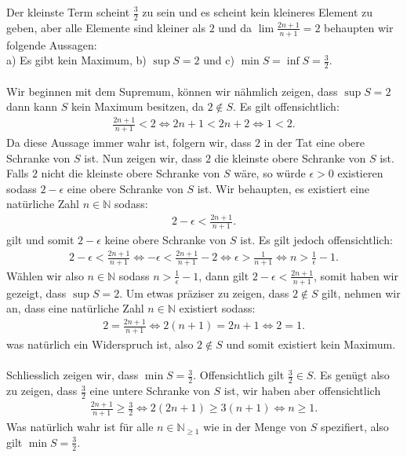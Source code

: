 \documentclass[a4paper, 20]{exam}
\begin{document}
\begin{solution} Der kleinste Term scheint $\frac{3}{2}$ zu sein und es scheint kein kleineres Element zu geben, aber alle Elemente sind kleiner als $2$ und da $\lim \frac{2n+1}{n+1}=2$ behaupten wir folgende Aussagen: \\
a) Es gibt kein Maximum, b) $\sup S =2$ und c) $\min S= \inf S = \frac{3}{2}$. 
\\\\
Wir beginnen mit dem Supremum, können wir nähmlich zeigen, dass $\sup S=2$ dann kann $S$ kein Maximum besitzen, da $2 \notin S$. Es gilt offensichtlich:
\begin{align*}
\frac{2n+1}{n+1} < 2 \iff 2n+1 < 2n+2 \iff 1 <2.
\end{align*}
Da diese Aussage immer wahr ist, folgern wir, dass $2$ in der Tat eine obere Schranke von $S$ ist. Nun zeigen wir, dass $2$ die kleinste obere Schranke von $S$ ist. Falls $2$ nicht die kleinste obere Schranke von $S$ wäre, so würde $ \epsilon >0$ existieren sodass $2 - \epsilon $ eine obere Schranke von $S$ ist. Wir behaupten, es existiert eine natürliche Zahl $n \in \mathbb{N}$ sodass:
\begin{align*}
2- \epsilon < \frac{2n+1}{n+1}.
\end{align*}
gilt und somit $2- \epsilon$ keine obere Schranke von $S$ ist. Es gilt jedoch offensichtlich:
\begin{align*}
2- \epsilon < \frac{2n+1}{n+1} \iff - \epsilon< \frac{2n+1}{n+1}-2 \iff \epsilon > \frac{1}{n+1} \iff n > \frac{1}{\epsilon}-1 .
\end{align*}
Wählen wir also $n \in \mathbb{N}$ sodass $n > \frac{1}{\epsilon}-1$, dann gilt $2- \epsilon < \frac{2n+1}{n+1}$, somit haben wir gezeigt, dass $\sup S=2$. Um etwas präziser zu zeigen, dass $2 \notin S$ gilt, nehmen wir an, dass eine natürliche Zahl $n \in \mathbb{N}$ existiert sodass:
\begin{align*}
2 = \frac{2n+1}{n+1} \iff 2(n+1)=2n+1 \iff 2=1.
\end{align*}
was natürlich ein Widerspruch ist,  also $2 \notin S$ und somit existiert kein Maximum. 
\\\\
Schliesslich zeigen wir, dass $\min S = \frac{3}{2}$. Offensichtlich gilt $\frac{3}{2} \in S$. Es genügt also zu zeigen, dass $\frac{3}{2}$ eine untere Schranke von $S$ ist, wir haben aber offensichtlich
\begin{align*}
\frac{2n+1}{n+1} \geq \frac{3}{2} \iff 2(2n+1) \geq 3(n+1) \iff  n \geq 1.
\end{align*}
Was natürlich wahr ist für alle $n \in \mathbb{N}_{ \geq 1}$ wie in der Menge von $S$ spezifiert, also gilt $\min S= \frac{3}{2}$. 
\end{solution}
\end{document}
